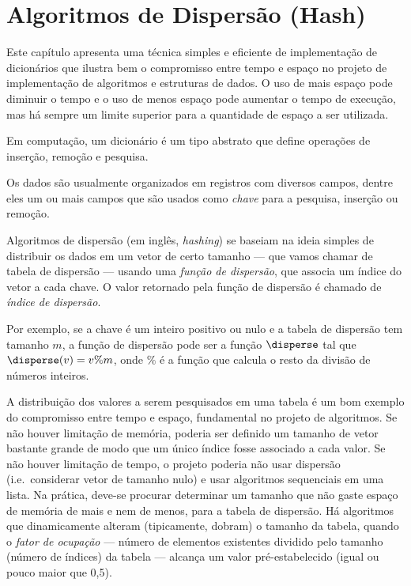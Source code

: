 \chapter{Algoritmos de Dispersão (Hash)}
\label{dispersao}

Este capítulo apresenta uma técnica simples e eficiente de
implementação de dicionários que ilustra bem o compromisso entre tempo
e espaço no projeto de implementação de algoritmos e estruturas de
dados. O uso de mais espaço pode diminuir o tempo e o uso de menos
espaço pode aumentar o tempo de execução, mas há sempre um limite
superior para a quantidade de espaço a ser utilizada.

 Em computação, um dicionário é um tipo abstrato que
define operações de inserção, remoção e pesquisa.

Os dados são usualmente organizados em registros com diversos campos,
dentre eles um ou mais campos que são usados como {\em chave\/} para a
pesquisa, inserção ou remoção.

  Algoritmos de
dispersão (em inglês, {\em hashing\/}) se baseiam na ideia simples de
distribuir os dados em um vetor de certo tamanho --- que vamos chamar
de tabela de dispersão --- usando uma {\em função de dispersão\/}, que
associa um índice do vetor a cada chave. O valor retornado pela função
de dispersão é chamado de {\em índice de dispersão\/}.

Por exemplo, se a chave é um inteiro positivo ou nulo e a tabela de
dispersão tem tamanho $m$, a função de dispersão pode ser a função
$\disperse$ tal que $\disperse(v) = v \% m$, onde $\%$ é a função que
calcula o resto da divisão de números inteiros.


A distribuição dos valores a serem pesquisados em uma tabela é um bom
exemplo do compromisso entre tempo e espaço, fundamental no projeto de
algoritmos. Se não houver limitação de memória, poderia ser definido
um tamanho de vetor bastante grande de modo que um único índice fosse
associado a cada valor. Se não houver limitação de tempo, o projeto
poderia não usar dispersão (i.e.~considerar vetor de tamanho nulo) e
usar algoritmos sequenciais em uma lista. Na prática, deve-se procurar
determinar um tamanho que não gaste espaço de memória de mais e nem de
menos, para a tabela de dispersão. Há algoritmos que dinamicamente
alteram (tipicamente, dobram) o tamanho da tabela, quando o {\em fator
  de ocupação\/} --- número de elementos existentes dividido pelo
tamanho (número de índices) da tabela --- alcança um valor
pré-estabelecido (igual ou pouco maior que 0,5).

